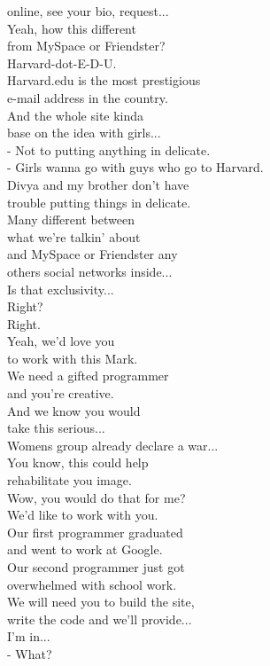 \documentclass{article}
\begin{document}
\begin{multicols}{3}
online, see your bio, request...\\
Yeah, how this different\\
from MySpace or Friendster?\\
Harvard-dot-E-D-U.\\
Harvard.edu is the most prestigious\\
e-mail address in the country.\\
And the whole site kinda\\
base on the idea with girls...\\
- Not to putting anything in delicate.\\
- Girls wanna go with guys who go to Harvard.\\
Divya and my brother don't have\\
trouble putting things in delicate.\\
Many different between\\
what we're talkin' about\\
and MySpace or Friendster any\\
others social networks inside...\\
Is that exclusivity...\\
Right?\\
Right.\\
Yeah, we'd love you\\
to work with this Mark.\\
We need a gifted programmer\\
and you're creative.\\
And we know you would\\
take this serious...\\
Womens group already declare a war...\\
You know, this could help\\
rehabilitate you image.\\
Wow, you would do that for me?\\
We'd like to work with you.\\
Our first programmer graduated\\
and went to work at Google.\\
Our second programmer just got\\
overwhelmed with school work.\\
We will need you to build the site,\\
write the code and we'll provide...\\
I'm in...\\
- What?\\

\end{multicols}
\end{document}
